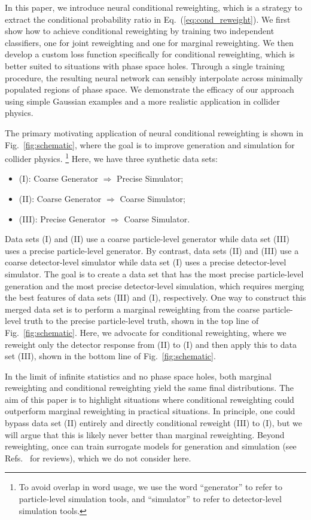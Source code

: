 \documentclass[aps,prx,reprint,preprintnumbers,superscriptaddress,nofootinbib,longbibliography,floatfix]{revtex4-2}
\DeclareRobustCommand{\Fig}[1]{Fig.~\ref{fig:#1}}
\DeclareRobustCommand{\Eq}[1]{Eq.~(\ref{eq:#1})}
\DeclareRobustCommand{\Refs}[1]{Refs.~\cite{#1}}
\begin{document}
In this paper, we introduce neural conditional reweighting, which is a strategy to extract the conditional probability ratio in \Eq{cond_reweight}.
%
We first show how to achieve conditional reweighting by training two independent classifiers, one for joint reweighting and one for marginal reweighting. 
%
We then develop a custom loss function specifically for conditional reweighting, which is better suited to situations with phase space holes.
%
Through a single training procedure, the resulting neural network can sensibly interpolate across minimally populated regions of phase space.
%
We demonstrate the efficacy of our approach using simple Gaussian examples and a more realistic application in collider physics.


The primary motivating application of neural conditional reweighting is shown in \Fig{schematic}, where the goal is to improve generation and simulation for collider physics.%
%
\footnote{To avoid overlap in word usage, we use the word ``generator'' to refer to particle-level simulation tools, and ``simulator'' to refer to detector-level simulation tools.}
%
Here, we have three synthetic data sets:
\begin{itemize}
    \item (I):  Coarse Generator $\Rightarrow$ Precise Simulator;
    \item (II):  Coarse Generator $\Rightarrow$ Coarse Simulator;
    \item (III):  Precise Generator $\Rightarrow$ Coarse Simulator.
\end{itemize}
%
Data sets (I) and (II) use a coarse particle-level generator while data set (III) uses a precise particle-level generator.
%
By contrast, data sets (II) and (III) use a coarse detector-level simulator while data set (I) uses a precise detector-level simulator.
%
The goal is to create a data set that has the most precise particle-level generation and the most precise detector-level simulation, which requires merging the best features of data sets (III) and (I), respectively.
%
One way to construct this merged data set is to perform a marginal reweighting from the coarse particle-level truth to the precise particle-level truth, shown in the top line of \Fig{schematic}.  
%
Here, we advocate for conditional reweighting, where we reweight only the detector response from (II) to (I) and then apply this to data set (III), shown in the bottom line of \Fig{schematic}.


In the limit of infinite statistics and no phase space holes, both marginal reweighting and conditional reweighting yield the same final distributions.
%
The aim of this paper is to highlight situations where conditional reweighting could outperform marginal reweighting in practical situations.
%
In principle, one could bypass data set (II) entirely and directly conditional reweight (III) to (I), but we will argue that this is likely never better than marginal reweighting.
%
Beyond reweighting, once can train surrogate models for generation and simulation (see \Refs{Butter:2020tvl,Alanazi:2021grv} for reviews), which we do not consider here.
\end{document}
